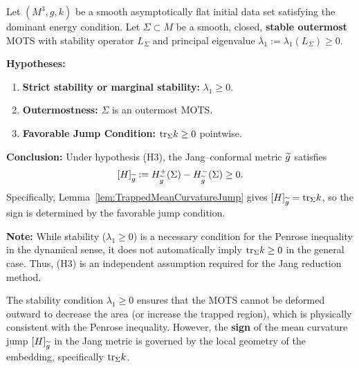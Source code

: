 \begin{theorem}\label{thm:CompleteMeanCurvatureJump}\label{thm:NonPerturbativeJumpPositivity}
Let $(M^3, g, k)$ be a smooth asymptotically flat initial data set satisfying the dominant energy condition. Let $\Sigma \subset M$ be a smooth, closed, \textbf{stable outermost} MOTS with stability operator $L_\Sigma$ and principal eigenvalue $\lambda_1 := \lambda_1(L_\Sigma) \ge 0$. 

\textbf{Hypotheses:}
\begin{enumerate}
    \item[(H1)] \textbf{Strict stability or marginal stability:} $\lambda_1 \ge 0$.
    \item[(H2)] \textbf{Outermostness:} $\Sigma$ is an outermost MOTS.
    \item[(H3)] \textbf{Favorable Jump Condition:} $\mathrm{tr}_\Sigma k \ge 0$ pointwise.
\end{enumerate}

\textbf{Conclusion:} Under hypothesis (H3), the Jang--conformal metric $\widetilde{g}$ satisfies
\begin{equation}\label{eq:MeanCurvatureJumpSign}
    [H]_{\widetilde{g}} := H^+_{\widetilde{g}}(\Sigma) - H^-_{\widetilde{g}}(\Sigma) \ge 0.
\end{equation}
Specifically, Lemma~\ref{lem:TrappedMeanCurvatureJump} gives $[H]_{\widetilde{g}} = \mathrm{tr}_\Sigma k$, so the sign is determined by the favorable jump condition.

\textbf{Note:} While stability ($\lambda_1 \ge 0$) is a necessary condition for the Penrose inequality in the dynamical sense, it does not automatically imply $\mathrm{tr}_\Sigma k \ge 0$ in the general case. Thus, (H3) is an independent assumption required for the Jang reduction method.
\end{theorem}

\begin{remark}\label{rem:NonPerturbativeSign}
The stability condition $\lambda_1 \ge 0$ ensures that the MOTS cannot be deformed outward to decrease the area (or increase the trapped region), which is physically consistent with the Penrose inequality. However, the \textbf{sign} of the mean curvature jump $[H]_{\widetilde{g}}$ in the Jang metric is governed by the local geometry of the embedding, specifically $\mathrm{tr}_\Sigma k$.
\end{remark}

